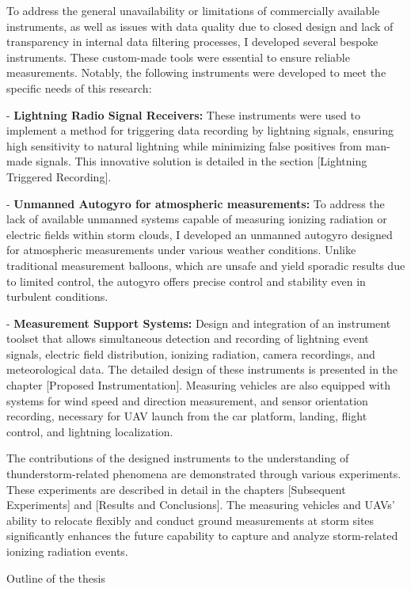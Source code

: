 To address the general unavailability or limitations of commercially available instruments, as well as issues with data quality due to closed design and lack of transparency in internal data filtering processes, I developed several bespoke instruments. These custom-made tools were essential to ensure reliable measurements. Notably, the following instruments were developed to meet the specific needs of this research:

\begitems
\item - {\bf Lightning Radio Signal Receivers:}
These instruments were used to implement a method for triggering data recording by lightning signals, ensuring high sensitivity to natural lightning while minimizing false positives from man-made signals. This innovative solution is detailed in the section [Lightning Triggered Recording].
\item - {\bf Unmanned Autogyro for atmospheric measurements:}
To address the lack of available unmanned systems capable of measuring ionizing radiation or electric fields within storm clouds, I developed an unmanned autogyro designed for atmospheric measurements under various weather conditions. Unlike traditional measurement balloons, which are unsafe and yield sporadic results due to limited control, the autogyro offers precise control and stability even in turbulent conditions.
\item - {\bf Measurement Support Systems:}
Design and integration of an instrument toolset that allows simultaneous detection and recording of lightning event signals, electric field distribution, ionizing radiation, camera recordings, and meteorological data. The detailed design of these instruments is presented in the chapter [Proposed Instrumentation]. Measuring vehicles are also equipped with systems for wind speed and direction measurement, and sensor orientation recording, necessary for UAV launch from the car platform, landing, flight control, and lightning localization.
\enditems

The contributions of the designed instruments to the understanding of thunderstorm-related phenomena are demonstrated through various experiments. These experiments are described in detail in the chapters [Subsequent Experiments] and [Results and Conclusions]. The measuring vehicles and UAVs' ability to relocate flexibly and conduct ground measurements at storm sites significantly enhances the future capability to capture and analyze storm-related ionizing radiation events.


\sec Outline of the thesis

